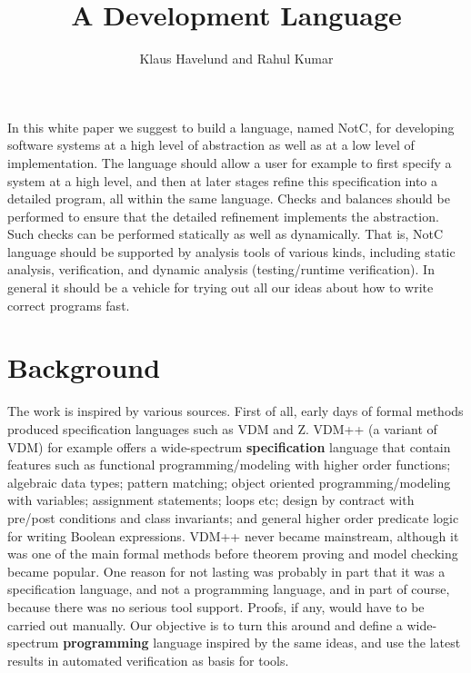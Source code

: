 \documentclass{llncs}
\title{A Development Language}
\author{Klaus Havelund and Rahul Kumar}
\institute{
  Jet Propulsion Laboratory\\
  California Institute of Technology\\
  California, USA
}
\newcommand{\lang}{NotC}
\begin{document}
\maketitle

In this white paper we suggest to build a language, named \lang{}, for 
developing software systems at a high level of abstraction as well as at 
a low level of implementation. The language should allow a user for example 
to first specify a system at a high level, and then at later stages refine
this specification into a detailed program, all within the same language. 
Checks and balances should be performed to ensure that the detailed refinement 
implements the abstraction. Such checks can be performed statically as well 
as dynamically. That is, \lang{} language should be supported by analysis tools of 
various kinds, including static analysis, verification, and dynamic analysis 
(testing/runtime verification). In general it should be a vehicle for trying 
out all our ideas about how to write correct programs fast. 

\section{Background}

The work is inspired by various sources. First of all, early days of formal 
methods produced specification languages such as VDM and Z. VDM++  (a variant of VDM) for 
example offers a wide-spectrum {\bf specification} language that contain features such as functional 
programming/modeling with higher order functions; algebraic data types; 
pattern matching; object oriented programming/modeling with variables; 
assignment statements; loops etc; design by contract with pre/post conditions 
and class invariants; and general higher order predicate logic for writing 
Boolean expressions. VDM++ never became mainstream, although it was one of 
the main formal methods before theorem proving and model checking became popular. 
One reason for not lasting was probably in part that it  was a specification 
language, and not a programming language, and in part of course, because there
was no serious tool support. Proofs, if any, would have to be carried out manually. 
Our objective is to turn this around and define a wide-spectrum {\bf programming} language 
inspired by the same ideas, and use the latest results in automated verification as
basis for tools.
\end{document}
